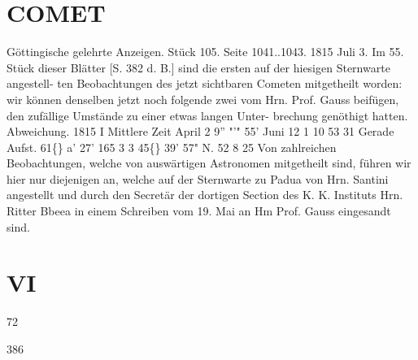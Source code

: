 \documentclass[12pt,a4paper]{article}
\newcommand{\degree}{\textdegree}
\begin{document}
\section*{COMET}
Göttingische  gelehrte  Anzeigen.    Stück  105.  Seite  1041..1043.    1815  Juli  3. 
Im  55.  Stück  dieser  Blätter  [S.  382  d.  B.]  sind  die  ersten  auf  der  hiesigen  Sternwarte  angestell- 
ten Beobachtungen  des  jetzt  sichtbaren  Cometen  mitgetheilt  worden:  wir  können  denselben  jetzt  noch 
folgende  zwei  vom  Hrn.  Prof.  Gauss  beifügen,  den  zufällige  Umstände  zu  einer  etwas  langen  Unter- 
brechung genöthigt  hatten. 
Abweichung. 
1815        I  Mittlere  Zeit 
April    2  9''  "'"  55' 
Juni    12     1     10     53     31 
Gerade  Aufst. 
61\degree\{\}  a'   27' 
165     3       3 
45\degree\{\}  39'    57"  N. 
52      8     25 
Von  zahlreichen  Beobachtungen,  welche  von  auswärtigen  Astronomen  mitgetheilt  sind,  führen 
wir  hier  nur  diejenigen  an,  welche  auf  der  Sternwarte  zu  Padua  von  Hrn.  Santini  angestellt  und  durch 
den  Secretär  der  dortigen  Section  des  K.  K.  Instituts  Hrn.  Ritter  Bbeea  in  einem  Schreiben  vom  19. 
Mai  an  Hm  Prof.  Gauss  eingesandt  sind. 

\section*{VI}
72 


\newpage
386 
\end{document}
